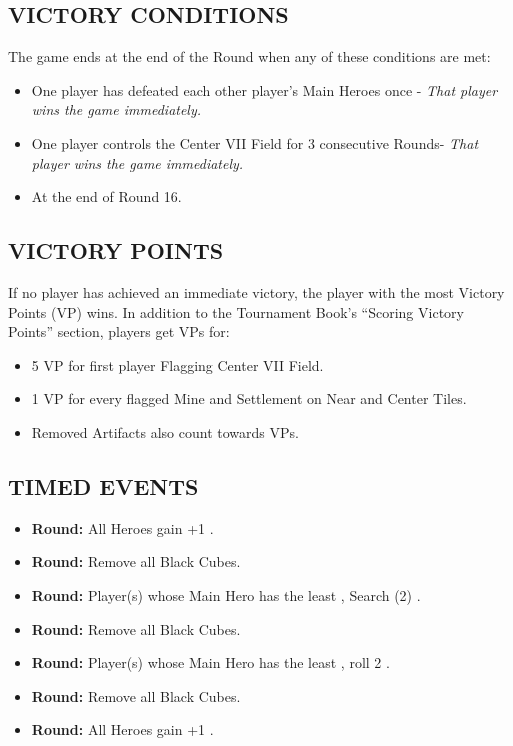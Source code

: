 \begin{multicols*}{2}
\subsection*{\MakeUppercase{Victory Conditions}}
The game ends at the end of the Round when any of these conditions are met:

\begin{itemize}
  \item One player has defeated each other player's Main Heroes once - \textit{That player wins the game immediately.}
  \item One player controls the Center VII Field for 3 consecutive Rounds- \textit{That player wins the game immediately.}
  \item At the end of Round 16.
\end{itemize}

\subsection*{\MakeUppercase{Victory Points}}
If no player has achieved an immediate victory, the player with the most Victory Points (VP) wins.
In addition to the Tournament Book's ``Scoring Victory Points'' section, players get VPs for:

\begin{itemize}
  \item 5 VP for first player Flagging Center VII Field.
  \item 1 VP for every flagged Mine and Settlement on Near and Center Tiles.
  \item Removed Artifacts also count towards VPs.
\end{itemize}

\subsection*{\MakeUppercase{Timed Events}}

\begin{itemize}
  \item[\textbf{\nth{1}}] \textbf{Round:} All Heroes gain +1 .
  \item[\textbf{\nth{4}}] \textbf{Round:} Remove all Black Cubes.
  \item[\textbf{\nth{6}}] \textbf{Round:} Player(s) whose Main Hero has the least , Search (2) .
  \item[\textbf{\nth{9}}] \textbf{Round:} Remove all Black Cubes.
  \item[\textbf{\nth{10}}] \textbf{Round:} Player(s) whose Main Hero has the least , roll 2 .
  \item[\textbf{\nth{12}}] \textbf{Round:} Remove all Black Cubes.
  \item[\textbf{\nth{13}}] \textbf{Round:} All Heroes gain +1 .
\end{itemize}

\end{multicols*}

